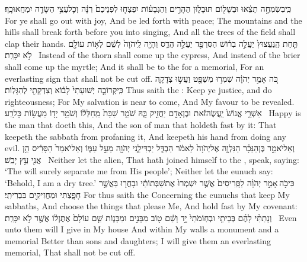{כִּֽי\maqqaf בְשִׂמְחָ֣ה תֵצֵ֔אוּ וּבְשָׁל֖וֹם תּוּבָל֑וּן הֶהָרִ֣ים וְהַגְּבָע֗וֹת יִפְצְח֤וּ לִפְנֵיכֶם֙ רִנָּ֔ה וְכׇל\maqqaf עֲצֵ֥י הַשָּׂדֶ֖ה יִמְחֲאוּ\maqqaf כָֽף׃}
{For ye shall go out with joy, And be led forth with peace; The mountains and the hills shall break forth before you into singing, And all the trees of the field shall clap their hands.}
{תַּ֤חַת הַֽנַּעֲצוּץ֙ יַעֲלֶ֣ה בְר֔וֹשׁ  הַסִּרְפַּ֖ד יַעֲלֶ֣ה הֲדַ֑ס וְהָיָ֤ה לַֽיהֹוָה֙ לְשֵׁ֔ם לְא֥וֹת עוֹלָ֖ם לֹ֥א יִכָּרֵֽת׃ \petucha }
{Instead of the thorn shall come up the cypress, And instead of the brier shall come up the myrtle; And it shall be to the \lord\space for a memorial, For an everlasting sign that shall not be cut off.}
\newperek
{}
{כֹּ֚ה אָמַ֣ר יְהֹוָ֔ה שִׁמְר֥וּ מִשְׁפָּ֖ט וַעֲשׂ֣וּ צְדָקָ֑ה כִּֽי\maqqaf קְרוֹבָ֤ה יְשׁוּעָתִי֙ לָב֔וֹא וְצִדְקָתִ֖י לְהִגָּלֽוֹת׃}
{Thus saith the \lord: Keep ye justice, and do righteousness; For My salvation is near to come, And My favour to be revealed.}
{אַשְׁרֵ֤י אֱנוֹשׁ֙ יַֽעֲשֶׂה\maqqaf זֹּ֔את וּבֶן\maqqaf אָדָ֖ם יַחֲזִ֣יק בָּ֑הּ שֹׁמֵ֤ר שַׁבָּת֙ מֵֽחַלְּל֔וֹ וְשֹׁמֵ֥ר יָד֖וֹ מֵעֲשׂ֥וֹת כׇּל\maqqaf רָֽע׃ \setuma }
{Happy is the man that doeth this, And the son of man that holdeth fast by it: That keepeth the sabbath from profaning it, And keepeth his hand from doing any evil.}
{וְאַל\maqqaf יֹאמַ֣ר בֶּן\maqqaf הַנֵּכָ֗ר הַנִּלְוָ֤ה אֶל\maqqaf יְהֹוָה֙ לֵאמֹ֔ר הַבְדֵּ֧ל יַבְדִּילַ֛נִי יְהֹוָ֖ה מֵעַ֣ל עַמּ֑וֹ וְאַל\maqqaf יֹאמַר֙ הַסָּרִ֔יס הֵ֥ן אֲנִ֖י עֵ֥ץ יָבֵֽשׁ׃ \petucha }
{Neither let the alien, That hath joined himself to the \lord, speak, saying: ‘The \lord\space will surely separate me from His people’; Neither let the eunuch say: ‘Behold, I am a dry tree.’}
{כִּי\maqqaf כֹ֣ה \legarmeh  אָמַ֣ר יְהֹוָ֗ה לַסָּֽרִיסִים֙ אֲשֶׁ֤ר יִשְׁמְרוּ֙ אֶת\maqqaf שַׁבְּתוֹתַ֔י וּבָחֲר֖וּ בַּאֲשֶׁ֣ר חָפָ֑צְתִּי וּמַחֲזִיקִ֖ים בִּבְרִיתִֽי׃}
{For thus saith the \lord\space Concerning the eunuchs that keep My sabbaths, And choose the things that please Me, And hold fast by My covenant:}
{וְנָתַתִּ֨י לָהֶ֜ם בְּבֵיתִ֤י וּבְחֽוֹמֹתַי֙ יָ֣ד וָשֵׁ֔ם ט֖וֹב מִבָּנִ֣ים וּמִבָּנ֑וֹת שֵׁ֤ם עוֹלָם֙ אֶתֶּן\maqqaf ל֔וֹ אֲשֶׁ֖ר לֹ֥א יִכָּרֵֽת׃ \setuma }
{Even unto them will I give in My house And within My walls a monument and a memorial Better than sons and daughters; I will give them an everlasting memorial, That shall not be cut off.}
